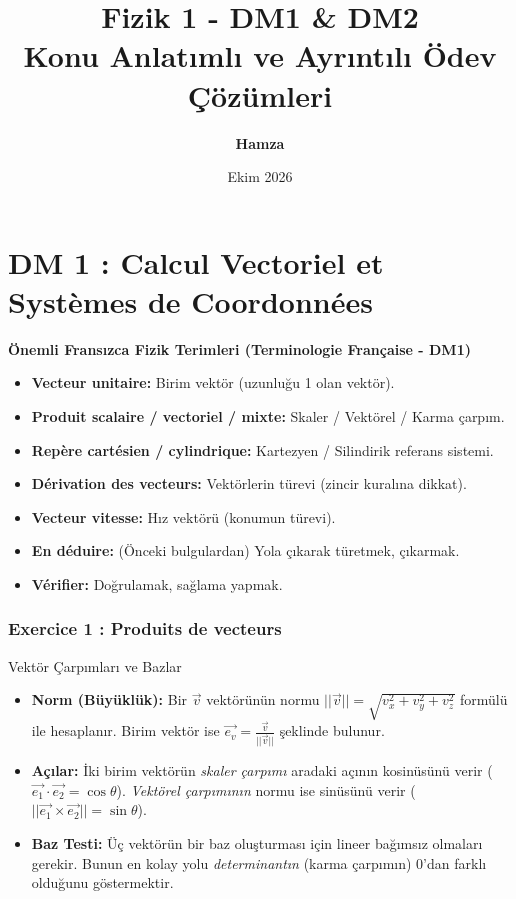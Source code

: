 \documentclass[11pt,a4paper]{article}
\title{\textcolor{myblue}{\Huge\textbf{Fizik 1 - DM1 \& DM2}}\\[0.3cm]
\Large\textbf{Konu Anlatımlı ve Ayrıntılı Ödev Çözümleri}}
\author{\textbf{Hamza}}
\date{Ekim 2026}
\begin{document}
\maketitle
\tableofcontents
\newpage

\part*{DM 1 : Calcul Vectoriel et Systèmes de Coordonnées}

\begin{terimbox}{\textbf{Önemli Fransızca Fizik Terimleri (Terminologie Française - DM1)}}
\begin{itemize}
    \item \textbf{Vecteur unitaire:} Birim vektör (uzunluğu 1 olan vektör).
    \item \textbf{Produit scalaire / vectoriel / mixte:} Skaler / Vektörel / Karma çarpım.
    \item \textbf{Repère cartésien / cylindrique:} Kartezyen / Silindirik referans sistemi.
    \item \textbf{Dérivation des vecteurs:} Vektörlerin türevi (zincir kuralına dikkat).
    \item \textbf{Vecteur vitesse:} Hız vektörü (konumun türevi).
    \item \textbf{En déduire:} (Önceki bulgulardan) Yola çıkarak türetmek, çıkarmak.
    \item \textbf{Vérifier:} Doğrulamak, sağlama yapmak.
\end{itemize}
\end{terimbox}

\vspace{0.5cm}

\section*{Exercice 1 : Produits de vecteurs}

\begin{theoriebox}{Vektör Çarpımları ve Bazlar}
\begin{itemize}
    \item \textbf{Norm (Büyüklük):} Bir $\vec{v}$ vektörünün normu $||\vec{v}|| = \sqrt{v_x^2 + v_y^2 + v_z^2}$ formülü ile hesaplanır. Birim vektör ise $\vec{e_v} = \frac{\vec{v}}{||\vec{v}||}$ şeklinde bulunur.
    \item \textbf{Açılar:} İki birim vektörün \textit{skaler çarpımı} aradaki açının kosinüsünü verir ($\vec{e_1} \cdot \vec{e_2} = \cos\theta$). \textit{Vektörel çarpımının} normu ise sinüsünü verir ($||\vec{e_1} \times \vec{e_2}|| = \sin\theta$).
    \item \textbf{Baz Testi:} Üç vektörün bir baz oluşturması için lineer bağımsız olmaları gerekir. Bunun en kolay yolu \textit{determinantın} (karma çarpımın) $0$'dan farklı olduğunu göstermektir.
\end{itemize}
\end{theoriebox}
\end{document}
